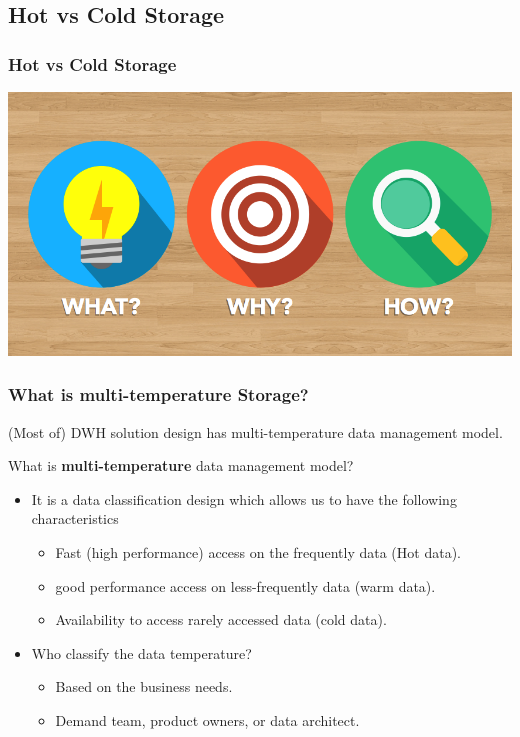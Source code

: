 \subsection{Hot vs Cold Storage}
\begin{frame}[c]
\frametitle{Hot vs Cold Storage}

\includegraphics[width=\textheight]{./Figures/chapter-01/WWH-Thumb.png}



\end{frame}


\begin{frame}
\frametitle{What is multi-temperature Storage?}

\begin{wideitemize}
	\item (Most of) DWH solution design has multi-temperature data management model.
	\item What is \textbf{multi-temperature} data management model?
	\begin{itemize}[<+->]
		\item It is a data classification design which allows us to have the following characteristics 
			\begin{itemize}[<+->] 
				\item Fast (high performance) access on the frequently data (Hot data).%
				\item good performance access on less-frequently data (warm data).
				\item Availability to access rarely accessed data (cold data).
			\end{itemize}
 		\item Who classify the data temperature? 
 		\begin{itemize}[<+->] 
 			\item Based on the business needs.
 			\item Demand team, product owners, or data architect.
 		\end{itemize}
 		
	\end{itemize}

\end{wideitemize}
\end{frame}

